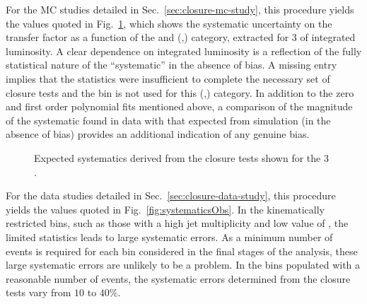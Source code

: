 For the MC studies detailed in Sec.~\ref{sec:closure-mc-study}, this 
procedure yields the values quoted in
Fig.~\ref{fig:systematics}, which shows the systematic uncertainty
on the transfer factor as a function of the \scalht and (\nb,\njet)
category, extracted for 3 \ifb of integrated luminosity.
A clear dependence on integrated luminosity is a
reflection of the fully statistical nature of the ``systematic'' in
the absence of bias. A missing entry implies that the statistics were
insufficient to complete the necessary set of closure tests and the
\scalht bin is not used for this (\njet,\nb) category. In addition to
the zero and first order polynomial fits mentioned above, a comparison
of the magnitude of the systematic found in data with that expected
from simulation (\ie in the absence of bias) provides an
additional indication of any genuine bias.

\begin{figure}[]
  \centering
  \caption{\label{fig:systematics} Expected systematics derived from the closure tests shown for
the 3 \ifb.}
\end{figure}

For the data studies detailed in Sec.~\ref{sec:closure-data-study},
this procedure yields the values quoted in
Fig.~\ref{fig:systematicsObs}. In the kinematically restricted bins, such
as those with a high jet multiplicity and low value of \scalht, the
limited statistics leads to large systematic errors. As a minimum number of
events is required for each bin considered in the final stages of the
analysis, these large systematic errors are unlikely to be a problem.
In the bins populated with a reasonable number of events, the
systematic errors determined from the closure tests vary from $10$ to
$40\%$.

